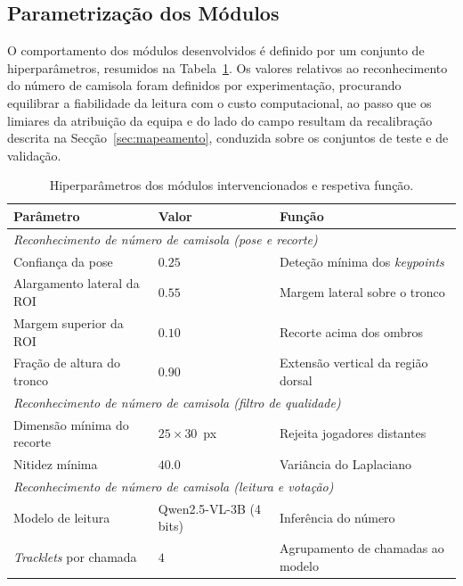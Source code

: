 \subsection{Parametrização dos Módulos}

O comportamento dos módulos desenvolvidos é definido por um conjunto de hiperparâmetros, resumidos na
Tabela~\ref{tab:hiperparametros}. Os valores relativos ao reconhecimento do número de camisola foram
definidos por experimentação, procurando equilibrar a fiabilidade da leitura com o custo
computacional, ao passo que os limiares da atribuição da equipa e do lado do campo resultam da
recalibração descrita na Secção~\ref{sec:mapeamento}, conduzida sobre os conjuntos de teste e de
validação.


\begin{table}[htbp]
    \centering
    \caption{Hiperparâmetros dos módulos intervencionados e respetiva função.}
    \label{tab:hiperparametros}
    \begin{tabular}{lll}
        \hline
        \textbf{Parâmetro} & \textbf{Valor} & \textbf{Função} \\
        \hline
        \multicolumn{3}{l}{\emph{Reconhecimento de número de camisola (pose e recorte)}} \\
        Confiança da pose            & $0.25$          & Deteção mínima dos \emph{keypoints} \\
        Alargamento lateral da ROI   & $0.55$          & Margem lateral sobre o tronco \\
        Margem superior da ROI       & $0.10$          & Recorte acima dos ombros \\
        Fração de altura do tronco   & $0.90$          & Extensão vertical da região dorsal \\
        \hline
        \multicolumn{3}{l}{\emph{Reconhecimento de número de camisola (filtro de qualidade)}} \\
        Dimensão mínima do recorte   & $25\times30$~px & Rejeita jogadores distantes \\
        Nitidez mínima               & $40.0$          & Variância do Laplaciano \\
        \hline
        \multicolumn{3}{l}{\emph{Reconhecimento de número de camisola (leitura e votação)}} \\
        Modelo de leitura            & Qwen2.5-VL-3B (4 bits) & Inferência do número \\
        \emph{Tracklets} por chamada & $4$             & Agrupamento de chamadas ao modelo \\

\end{tabular}
\end{table}
